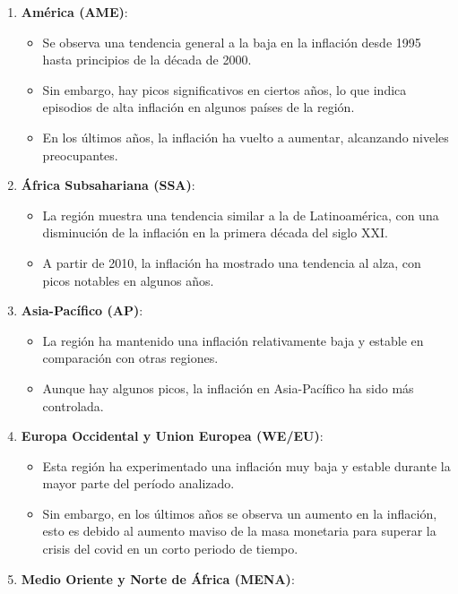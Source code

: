 \documentclass[
]{article}
\providecommand{\tightlist}{%
  \setlength{\itemsep}{0pt}\setlength{\parskip}{0pt}}
\begin{document}
\begin{enumerate}
\def\labelenumi{\arabic{enumi}.}
\tightlist
\item
  \textbf{América (AME)}:

  \begin{itemize}
  \tightlist
  \item
    Se observa una tendencia general a la baja en la inflación desde
    1995 hasta principios de la década de 2000.
  \item
    Sin embargo, hay picos significativos en ciertos años, lo que indica
    episodios de alta inflación en algunos países de la región.
  \item
    En los últimos años, la inflación ha vuelto a aumentar, alcanzando
    niveles preocupantes.
  \end{itemize}
\item
  \textbf{África Subsahariana (SSA)}:

  \begin{itemize}
  \tightlist
  \item
    La región muestra una tendencia similar a la de Latinoamérica, con
    una disminución de la inflación en la primera década del siglo XXI.
  \item
    A partir de 2010, la inflación ha mostrado una tendencia al alza,
    con picos notables en algunos años.
  \end{itemize}
\item
  \textbf{Asia-Pacífico (AP)}:

  \begin{itemize}
  \tightlist
  \item
    La región ha mantenido una inflación relativamente baja y estable en
    comparación con otras regiones.
  \item
    Aunque hay algunos picos, la inflación en Asia-Pacífico ha sido más
    controlada.
  \end{itemize}
\item
  \textbf{Europa Occidental y Union Europea (WE/EU)}:

  \begin{itemize}
  \tightlist
  \item
    Esta región ha experimentado una inflación muy baja y estable
    durante la mayor parte del período analizado.
  \item
    Sin embargo, en los últimos años se observa un aumento en la
    inflación, esto es debido al aumento maviso de la masa monetaria
    para superar la crisis del covid en un corto periodo de tiempo.
  \end{itemize}
\item
  \textbf{Medio Oriente y Norte de África (MENA)}:


\end{enumerate}
\end{document}
